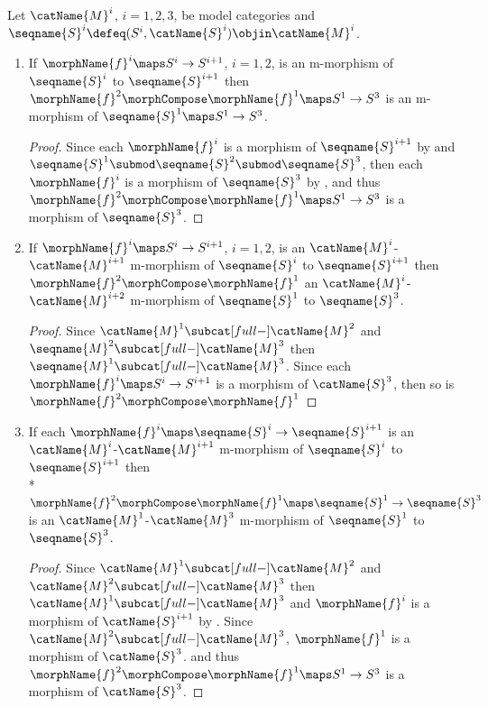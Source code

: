 \documentclass{article}
\begin{document}
\begin{lemma}
\label{lem:modMmorphcomp}
Let $\catName{M}^i$, $i=1,2,3$, be model categories and
$\seqname{S}^i \defeq (S^i, \catName{S}^i) \objin \catName{M}^i$.

\begin{enumerate}

\item
If $\morphName{f}^i \maps S^i \to S^{i+1}$, $i=1,2$, is an m-morphism of
$\seqname{S}^i$ to $\seqname{S}^{i+1}$ then
$\morphName{f}^2 \morphCompose \morphName{f}^1 \maps S^1 \to S^3$ is an
m-morphism of $\seqname{S}^1 \maps S^1 \to S^3$.

\begin{proof}
Since each $\morphName{f}^i$ is a morphism of $\seqname{S}^{i+1}$ by
 and
$\seqname{S}^1 \submod \seqname{S}^2 \submod \seqname{S}^3$, then
each $\morphName{f}^i$ is a morphism of $\seqname{S}^3$ by
, and thus
$\morphName{f}^2 \morphCompose \morphName{f}^1 \maps S^1 \to S^3$ is a morphism
of $\seqname{S}^3$.
\end{proof}

\item
If $\morphName{f}^i \maps S^i \to S^{i+1}$, $i=1,2$, is an
$\catName{M}^i$-$\catName{M}^{i+1}$ m-morphism of $\seqname{S}^i$ to
$\seqname{S}^{i+1}$ then $\morphName{f}^2 \morphCompose \morphName{f}^1$ an
$\catName{M}^i$-$\catName{M}^{i+2}$ m-morphism of $\seqname{S}^1$ to
$\seqname{S}^3$.

\begin{proof}
Since $\catName{M}^1 \subcat[full-] \catName{M}^2$ and
$\seqname{M}^2 \subcat[full-] \catName{M}^3$ then
$\seqname{M}^1 \subcat[full-] \catName{M}^3$.
Since each $\morphName{f}^i \maps S^i \to S^{i+1}$ is a morphism of
$\catName{S}^3$, then so is $\morphName{f}^2 \morphCompose \morphName{f}^1$
\end{proof}

\item
If each $\morphName{f}^i \maps \seqname{S}^i \to \seqname{S}^{i+1}$ is
an $\catName{M}^i$-$\catName{M}^{i+1}$ m-morphism of
$\seqname{S}^i$ to $\seqname{S}^{i+1}$ then \\*
\nobreaks
  {{
  $
    \morphName{f}^2 \morphCompose \morphName{f}^1 \maps
    \seqname{S}^1 \to \seqname{S}^3
  $
  }}
is an $\catName{M}^1$-$\catName{M}^3$ m-morphism of
$\seqname{S}^1$ to $\seqname{S}^3$.

\begin{proof}
Since $\catName{M}^1 \subcat[full-] \catName{M}^2$ and
$\catName{M}^2 \subcat[full-] \catName{M}^3$ then
$\catName{M}^1 \subcat[full-] \catName{M}^3$ and
$\morphName{f}^i$ is a morphism of $\catName{S}^{i+1}$ by
.
Since
\nobreaks
  {{
    $\catName{M}^2 \subcat[full-] \catName{M}^3$,
  }}
$\morphName{f}^1$ is a
morphism of $\catName{S}^3$. and thus
$\morphName{f}^2 \morphCompose \morphName{f}^1 \maps S^1 \to S^3$ is a morphism
of $\catName{S}^3$.
\end{proof}
\end{enumerate}
\end{lemma}
\end{document}
